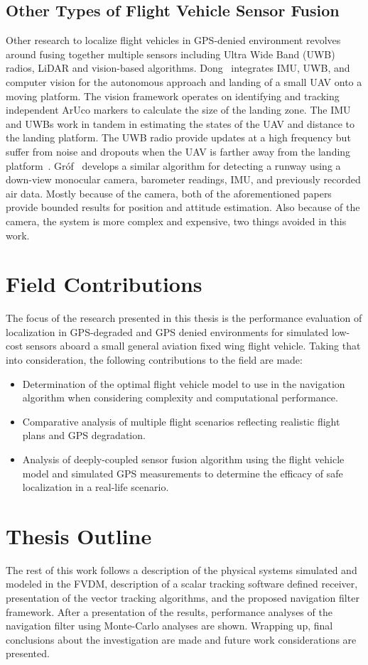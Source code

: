 \subsection{Other Types of Flight Vehicle Sensor Fusion}
Other research to localize flight vehicles in GPS-denied environment revolves around fusing together multiple sensors including Ultra Wide Band (UWB) radios, LiDAR and vision-based algorithms. Dong~\cite{dongIntegratedUWBIMUVisionFramework2022} integrates IMU, UWB, and computer vision for the autonomous approach and landing of a small UAV onto a moving platform. The vision framework operates on identifying and tracking independent ArUco markers to calculate the size of the landing zone. The IMU and UWBs work in tandem in estimating the states of the UAV and distance to the landing platform. The UWB radio provide updates at a high frequency but suffer from noise and dropouts when the UAV is farther away from the landing platform~\cite{dongIntegratedUWBIMUVisionFramework2022}. Gr\'of~\cite{grofPositioningAircraftRelative2022} develops a similar algorithm for detecting a runway using a down-view monocular camera, barometer readings, IMU, and previously recorded air data. Mostly because of the camera, both of the aforementioned papers provide bounded results for position and attitude estimation. Also because of the camera, the system is more complex and expensive, two things avoided in this work.

\section{Field Contributions}
The focus of the research presented in this thesis is the performance evaluation of localization in GPS-degraded and GPS denied environments for simulated low-cost sensors aboard a small general aviation fixed wing flight vehicle. Taking that into consideration, the following contributions to the field are made:
\begin{itemize}
    \item Determination of the optimal flight vehicle model to use in the navigation algorithm when considering complexity and computational performance.
    \item Comparative analysis of multiple flight scenarios reflecting realistic flight plans and GPS degradation.
    \item Analysis of deeply-coupled sensor fusion algorithm using the flight vehicle model and simulated GPS measurements to determine the efficacy of safe localization in a real-life scenario.
\end{itemize}

\section{Thesis Outline}
The rest of this work follows a description of the physical systems simulated and modeled in the FVDM, description of a scalar tracking software defined receiver, presentation of the vector tracking algorithms, and the proposed navigation filter framework. After a presentation of the results, performance analyses of the navigation filter using Monte-Carlo analyses are shown. Wrapping up, final conclusions about the investigation are made and future work considerations are presented.